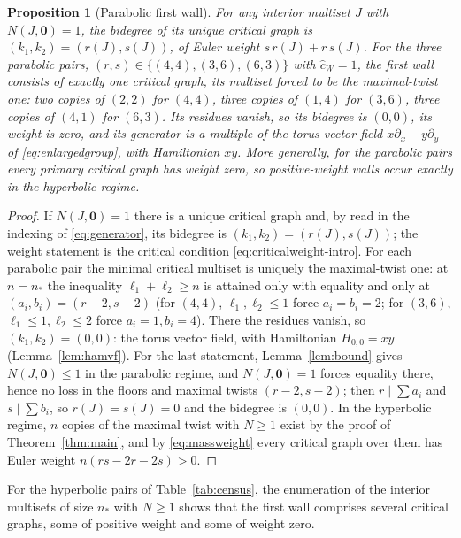 \documentclass[11pt]{amsart}
\newtheorem{proposition}[theorem]{Proposition}
\theoremstyle{definition}
\theoremstyle{remark}
\newcommand{\chat}{\hat{c}}
\begin{document}
\begin{proposition}[Parabolic first wall]
\label{prop:parabolic}
For any interior multiset $J$ with $N(J,\mathbf 0)=1$, the bidegree of its unique
critical graph is $(k_{1},k_{2})=(r(J),s(J))$, of Euler weight
$s\,r(J)+r\,s(J)$. For the
three parabolic pairs, $(r,s)\in\{(4,4),(3,6),(6,3)\}$ with $\chat_{W}=1$, the
first wall consists of exactly one critical graph, its multiset forced to be
the maximal-twist one: two copies of $(2,2)$ for $(4,4)$, three copies of
$(1,4)$ for $(3,6)$, three copies of $(4,1)$ for $(6,3)$. Its residues vanish,
so its bidegree is $(0,0)$, its weight is zero, and its generator is a multiple
of the torus vector field $x\partial_{x}-y\partial_{y}$ of
\eqref{eq:enlargedgroup}, with Hamiltonian $xy$.  More generally, for the
parabolic pairs every primary critical graph has weight zero, so positive-weight
walls occur exactly in the hyperbolic regime.
\end{proposition}

\begin{proof}
If $N(J,\mathbf 0)=1$ there is a unique critical graph and, by
\cite[Notation~2.40, eqn.~(2.31)]{GKT} read in the indexing of
\eqref{eq:generator}, its bidegree is $(k_{1},k_{2})=(r(J),s(J))$; the weight
statement is the critical condition \eqref{eq:criticalweight-intro}. For each parabolic pair
the minimal critical multiset is uniquely the maximal-twist one: at $n=n_{*}$
the inequality $\ell_{1}+\ell_{2}\geq n$ is attained only with equality and
only at $(a_{i},b_{i})=(r-2,s-2)$ (for $(4,4)$, $\ell_{1},\ell_{2}\leq1$ force
$a_{i}=b_{i}=2$; for $(3,6)$, $\ell_{1}\leq1,\ell_{2}\leq2$ force
$a_{i}=1,b_{i}=4$). There the residues vanish, so $(k_{1},k_{2})=(0,0)$: the
torus vector field, with Hamiltonian $H_{0,0}=xy$ (Lemma~\ref{lem:hamvf}).
For the last statement, Lemma~\ref{lem:bound} gives $N(J,\mathbf 0)\le1$ in
the parabolic regime, and $N(J,\mathbf 0)=1$ forces equality there, hence no
loss in the floors and maximal twists $(r-2,s-2)$; then $r\mid\sum a_i$ and
$s\mid\sum b_i$, so $r(J)=s(J)=0$ and the bidegree is $(0,0)$.  In the hyperbolic
regime, $n$ copies of the maximal twist with $N\ge1$ exist by the proof of
Theorem~\ref{thm:main}, and by \eqref{eq:massweight} every critical graph over
them has Euler weight $n(rs-2r-2s)>0$.
\end{proof}

For the hyperbolic pairs of Table~\ref{tab:census}, the enumeration of the
interior multisets of size $n_*$ with $N\ge1$ shows that the first wall
comprises several critical graphs, some of positive weight and some of
weight zero.
\end{document}
